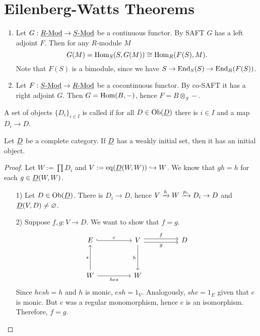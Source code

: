 
\section{Eilenberg-Watts Theorems}

\begin{enumerate}
	\item Let \( G: \underline{R\text{-}\mathrm{Mod}} \to \underline{S\text{-}\mathrm{Mod}} \) be a continuous functor. By SAFT \( G \) has a left adjoint \( F \). Then for any \( R \)-module \( M \)
		\[
			G(M) = \operatorname{Hom}_S(S, G(M)) \cong \operatorname{Hom}_R(F(S), M).
		\]
		Note that \( F(S) \) is a bimodule, since we have \( S \to \operatorname{End}_S(S) \to \operatorname{End}_R(F(S)) \).
	\item  Let \( F: \underline{S\text{-}\mathrm{Mod}} \to \underline{R\text{-}\mathrm{Mod}} \) be a cocontinuous functor. By co-SAFT it has a right adjoint \( G \). Then \( G = \operatorname{Hom}(B, -) \), hence \( F = B \otimes_S - \).
\end{enumerate}

\begin{definition*}
	A set of objects \( \{D_i\}_{i \in I} \) is called  if for all \( D \in \operatorname{Ob}(\underline{D}) \) there is \( i \in I \) and a map \( D_i \to D \).
\end{definition*}

\begin{lemma*}
	Let \( \underline{D} \) be a complete category. If \( \underline{D} \) has a weakly initial set, then it has an initial object.
\end{lemma*}
\begin{proof}
	Let \( W := \prod D_i \) and \( V := \operatorname{eq}(\underline{D}(W, W)) \hookrightarrow W \). We know that \( gh = h \) for each \( g \in \underline{D}(W, W) \).
	\begin{enumerate}
		\item[1)] Let \( D \in \operatorname{Ob}(\underline{D}) \). There is \( D_i \to D \), hence \( V \xrightarrow{h} W \xrightarrow{p_i} D_i \to D \) and \( \underline{D}(V, D) \neq \varnothing \).
		\item[2)] Suppose \( f,g: V \to D \). We want to show that \( f = g \).
			\[
				\begin{tikzcd}
					E && V && D \\
					\\
					W && W
					\arrow["e", hook, from=1-1, to=1-3]
					\arrow["f", shift left, from=1-3, to=1-5]
					\arrow["g"', shift right, from=1-3, to=1-5]
					\arrow["h"', from=1-3, to=3-3]
					\arrow["s", from=3-1, to=1-1]
					\arrow["hes"', from=3-1, to=3-3]
				\end{tikzcd}
			\]
			Since \( hesh = h \) and \( h \) is monic, \( esh = 1_V \). Analogously, \( she = 1_E \) given that \( e \) is monic. But \( e \) was a regular monomorphism, hence \( e \) is an isomorphism. Therefore, \( f = g \).
	\end{enumerate}
\end{proof}

